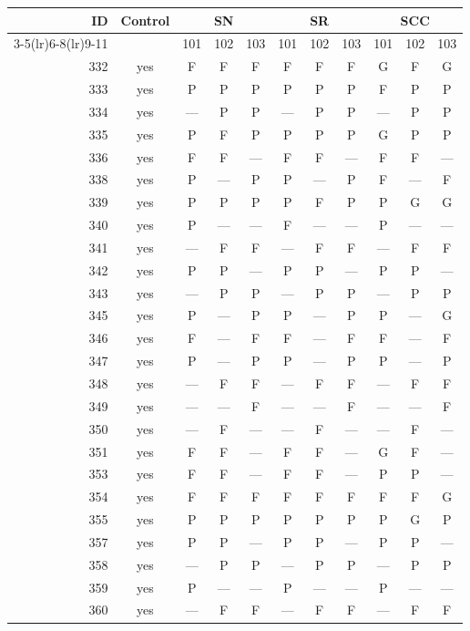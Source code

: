 \begin{table}[p]\centering\small
\begin{tabular*}{\textwidth}{@{\extracolsep{\fill}}rc*{9}{c}@{}}\toprule
ID & Control & \multicolumn{3}{c}{SN} & \multicolumn{3}{c}{SR} & \multicolumn{3}{c}{SCC}\\
\cmidrule(lr){3-5}\cmidrule(lr){6-8}\cmidrule(lr){9-11}
 & & 101 & 102 & 103 & 101 & 102 & 103 & 101 & 102 & 103\\\midrule
332 & yes & F & F & F & F & F & F & G & F & G\\
333 & yes & P & P & P & P & P & P & F & P & P\\
334 & yes & — & P & P & — & P & P & — & P & P\\
335 & yes & P & F & P & P & P & P & G & P & P\\
336 & yes & F & F & — & F & F & — & F & F & —\\
338 & yes & P & — & P & P & — & P & F & — & F\\
339 & yes & P & P & P & P & F & P & P & G & G\\
340 & yes & P & — & — & F & — & — & P & — & —\\
341 & yes & — & F & F & — & F & F & — & F & F\\
342 & yes & P & P & — & P & P & — & P & P & —\\
343 & yes & — & P & P & — & P & P & — & P & P\\
345 & yes & P & — & P & P & — & P & P & — & G\\
346 & yes & F & — & F & F & — & F & F & — & F\\
347 & yes & P & — & P & P & — & P & P & — & P\\
348 & yes & — & F & F & — & F & F & — & F & F\\
349 & yes & — & — & F & — & — & F & — & — & F\\
350 & yes & — & F & — & — & F & — & — & F & —\\
351 & yes & F & F & — & F & F & — & G & F & —\\
353 & yes & F & F & — & F & F & — & P & P & —\\
354 & yes & F & F & F & F & F & F & F & F & G\\
355 & yes & P & P & P & P & P & P & P & G & P\\
357 & yes & P & P & — & P & P & — & P & P & —\\
358 & yes & — & P & P & — & P & P & — & P & P\\
359 & yes & P & — & — & P & — & — & P & — & —\\
360 & yes & — & F & F & — & F & F & — & F & F\\

\end{tabular*}
\end{table}
